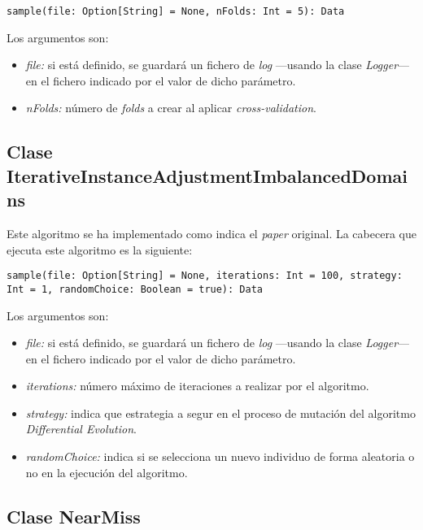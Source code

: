 \begin{lstlisting}[frame=single, basicstyle=\scriptsize, breaklines=true]
sample(file: Option[String] = None, nFolds: Int = 5): Data
\end{lstlisting}

Los argumentos son:

\begin{itemize}
    \item \textit{file:} si está definido, se guardará un fichero de \textit{log} —usando la clase \textit{Logger}— en el fichero indicado por el valor de dicho parámetro.
    \item \textit{nFolds:} número de \textit{folds} a crear al aplicar \textit{cross-validation}.
\end{itemize}

\subsection{Clase IterativeInstanceAdjustmentImbalancedDomains} \label{subsec:impl_iterativeinstanceadjustmentimbalanceddomains}

Este algoritmo se ha implementado como indica el \textit{paper} original. La cabecera que ejecuta este algoritmo es la siguiente:

\begin{lstlisting}[frame=single, basicstyle=\scriptsize, breaklines=true]
sample(file: Option[String] = None, iterations: Int = 100, strategy: Int = 1, randomChoice: Boolean = true): Data
\end{lstlisting}

Los argumentos son:

\begin{itemize}
    \item \textit{file:} si está definido, se guardará un fichero de \textit{log} —usando la clase \textit{Logger}— en el fichero indicado por el valor de dicho parámetro.
    \item \textit{iterations:} número máximo de iteraciones a realizar por el algoritmo.
    \item \textit{strategy:} indica que estrategia a segur en el proceso de mutación del algoritmo \textit{Differential Evolution}.
    \item \textit{randomChoice:} indica si se selecciona un nuevo individuo de forma aleatoria o no en la ejecución del algoritmo.
\end{itemize}


\subsection{Clase NearMiss} \label{subsec:impl_nearmiss}

